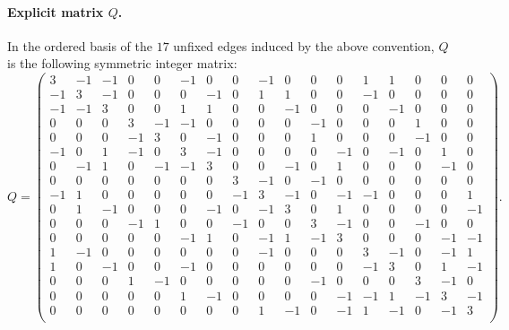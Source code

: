 \paragraph{Explicit matrix $Q$.}
In the ordered basis of the $17$ unfixed edges induced by the above convention, $Q$ is the following symmetric integer matrix:
{\tiny
\setcounter{MaxMatrixCols}{20}
\[
Q=\begin{pmatrix}
3 & -1 & -1 & 0 & 0 & -1 & 0 & 0 & -1 & 0 & 0 & 0 & 1 & 1 & 0 & 0 & 0 \\
-1 & 3 & -1 & 0 & 0 & 0 & -1 & 0 & 1 & 1 & 0 & 0 & -1 & 0 & 0 & 0 & 0 \\
-1 & -1 & 3 & 0 & 0 & 1 & 1 & 0 & 0 & -1 & 0 & 0 & 0 & -1 & 0 & 0 & 0 \\
0 & 0 & 0 & 3 & -1 & -1 & 0 & 0 & 0 & 0 & -1 & 0 & 0 & 0 & 1 & 0 & 0 \\
0 & 0 & 0 & -1 & 3 & 0 & -1 & 0 & 0 & 0 & 1 & 0 & 0 & 0 & -1 & 0 & 0 \\
-1 & 0 & 1 & -1 & 0 & 3 & -1 & 0 & 0 & 0 & 0 & -1 & 0 & -1 & 0 & 1 & 0 \\
0 & -1 & 1 & 0 & -1 & -1 & 3 & 0 & 0 & -1 & 0 & 1 & 0 & 0 & 0 & -1 & 0 \\
0 & 0 & 0 & 0 & 0 & 0 & 0 & 3 & -1 & 0 & -1 & 0 & 0 & 0 & 0 & 0 & 0 \\
-1 & 1 & 0 & 0 & 0 & 0 & 0 & -1 & 3 & -1 & 0 & -1 & -1 & 0 & 0 & 0 & 1 \\
0 & 1 & -1 & 0 & 0 & 0 & -1 & 0 & -1 & 3 & 0 & 1 & 0 & 0 & 0 & 0 & -1 \\
0 & 0 & 0 & -1 & 1 & 0 & 0 & -1 & 0 & 0 & 3 & -1 & 0 & 0 & -1 & 0 & 0 \\
0 & 0 & 0 & 0 & 0 & -1 & 1 & 0 & -1 & 1 & -1 & 3 & 0 & 0 & 0 & -1 & -1 \\
1 & -1 & 0 & 0 & 0 & 0 & 0 & 0 & -1 & 0 & 0 & 0 & 3 & -1 & 0 & -1 & 1 \\
1 & 0 & -1 & 0 & 0 & -1 & 0 & 0 & 0 & 0 & 0 & 0 & -1 & 3 & 0 & 1 & -1 \\
0 & 0 & 0 & 1 & -1 & 0 & 0 & 0 & 0 & 0 & -1 & 0 & 0 & 0 & 3 & -1 & 0 \\
0 & 0 & 0 & 0 & 0 & 1 & -1 & 0 & 0 & 0 & 0 & -1 & -1 & 1 & -1 & 3 & -1 \\
0 & 0 & 0 & 0 & 0 & 0 & 0 & 0 & 1 & -1 & 0 & -1 & 1 & -1 & 0 & -1 & 3 \\
\end{pmatrix}.
\]
}

